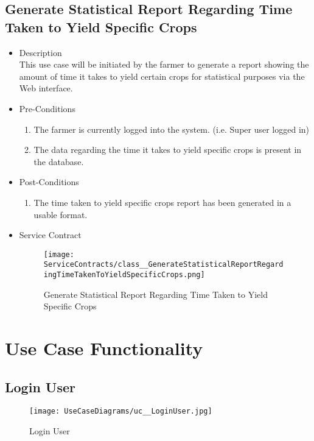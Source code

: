 \documentclass[11pt,fleqn]{book} %
\begin{document}
\section{Generate Statistical Report Regarding Time Taken to Yield Specific Crops}
\begin{itemize}
	\item Description\\
	This use case will be initiated by the farmer to generate a report showing the amount of time it takes to yield certain crops for statistical purposes via the Web interface.
	\item Pre-Conditions
	\begin{enumerate}
		\item The farmer is currently logged into the system. (i.e. Super user logged in)
		\item The data regarding the time it takes to yield specific crops is present in the database.
	\end{enumerate}
	\item Post-Conditions
	\begin{enumerate}
		\item The time taken to yield specific crops report has been generated in a usable format.
	\end{enumerate}
	\item Service Contract
	\begin{figure}
		\texttt{[image: ServiceContracts/class\_\_GenerateStatisticalReportRegardingTimeTakenToYieldSpecificCrops.png]}
		\caption{Generate Statistical Report Regarding Time Taken to Yield Specific Crops}
	\end{figure}
\end{itemize}




\chapter{Use Case Functionality} %

	\section{Login User}
	\begin{figure}
		\texttt{[image: UseCaseDiagrams/uc\_\_LoginUser.jpg]}
		\caption{Login User}
	\end{figure}
	
\end{document}
